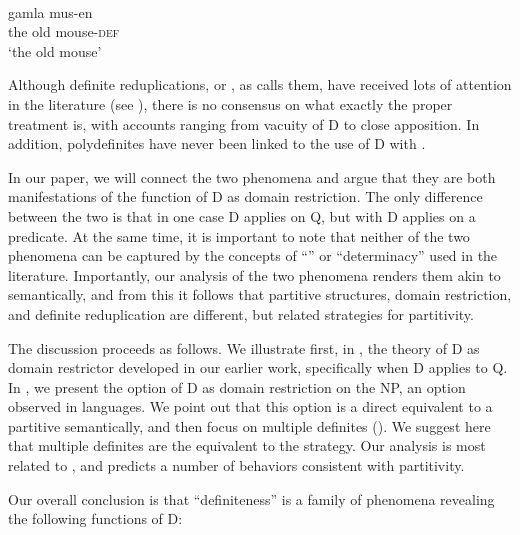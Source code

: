 \documentclass[output=paper,
modfonts
]{langscibook}
\begin{document}
\ea\label{ex:etxeberria:14}
	 \\
	 {gamla} {mus-en}\\ 
	the old mouse-\textsc{def}\\
	\glt `the old mouse'
\z

Although  definite reduplications, or , as \citet{kolliakou2004} calls them, have received lots of attention in the literature (see \citealt{AlexiadouWilder1998b, CamposStravrou2004, kolliakou2004, ioannidou-dendikken2006, lekakou-szendroi2007}), there is no consensus on what exactly the proper treatment is, with accounts ranging from vacuity of D to close apposition. In addition, polydefinites have never been linked to the use of D with . 

In our paper, we will connect the two phenomena and argue that they are both manifestations of the function of D as domain restriction. The only difference between the two is that in one case D applies on Q, but with  D applies on a predicate. At the same time, it is important to note that neither of the two phenomena can be captured by the concepts of ``'' or ``determinacy'' \citep{CoppockBeaver2015} used in the literature. Importantly, our analysis of the two phenomena renders them akin to  semantically, and from this it follows that partitive structures, domain restriction, and definite reduplication are different, but related strategies for partitivity. 

The discussion proceeds as follows. We illustrate first, in , the theory of D as domain restrictor developed in our earlier work, specifically when D applies to Q. In , we present the option of D as domain restriction on the NP, an option observed in  languages. We point out that this option is a direct equivalent to a partitive semantically, and then focus on multiple definites (). We suggest here that multiple definites are the  equivalent to the  strategy. Our analysis is most related to \citet{kolliakou2004}, and predicts a number of behaviors consistent with partitivity.

Our overall conclusion is that ``definiteness'' is a family of phenomena revealing the following functions of D:\pagebreak 
\end{document}

